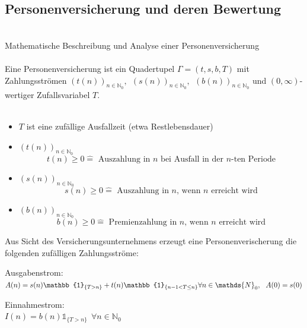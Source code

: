 \subsection{Personenversicherung und deren Bewertung}
\label{sub:personenversicherung}
\\
Mathematische Beschreibung und Analyse einer Personenversicherung\\
\\
Eine Personenversicherung ist ein Quadertupel $\Gamma=(t,s,b,T)$ mit Zahlungsströmen $(t(n))_{n \in \mathds{N}_0},~~(s(n))_{n\in \mathds{N}_0},~~(b(n))_{n \in \mathds{N}_0}$ und $(0,\infty)$-wertiger Zufallsvariabel $T$.\\
\\
\begin{itemize}
	\item $T$ ist eine zufällige Ausfallzeit (etwa Restlebensdauer)
	\item {} $(t(n))_{n\in \mathds{N}_0}$
	\[t(n)\ge 0 \mathrel{\hat=} \text{ Auszahlung in $n$ bei Ausfall in der $n$-ten Periode} \]
	\item {} $(s(n))_{n\in \mathds{N}_0}$
	\[s(n)\ge 0 \mathrel{\hat{=}} \text{ Auszahlung in $n$, wenn $n$ erreicht wird} \]
	\item {} $(b(n))_{n \in \mathds{N}_0}$
	\[b(n)\ge 0 \mathrel{\hat{=}} \text{ Premienzahlung in $n$, wenn $n$ erreicht wird} \]
\end{itemize}
Aus Sicht des Versicherungsunternehmens erzeugt eine Personenverischerung die folgenden zufälligen Zahlungsströme:\\

\begin{minipage}[t]{8.7cm}
	Ausgabenstrom:\\
	$A(n)=s(n) \mathbb{1}_{\{T>n \}} + t(n) \mathbb{1}_{\{n-1<T\le n \}} \\ \forall n \in \mathds{N}_0,~~A(0)=s(0)$
\end{minipage}
\begin{minipage}[t]{5cm}
	Einnahmestrom:\\
	$I(n)=b(n)\mathbb{1}_{\{T>n \}}~~\forall n \in \mathds{N}_0$
\end{minipage}

